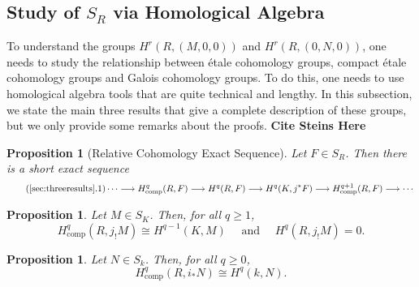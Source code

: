 \documentclass{article}
\newcommand{\comp}{\mathrm{comp}}
\theoremstyle{plain}
\newtheorem{proposition}[theorem]{Proposition}
\theoremstyle{definition}
\begin{document}
    \subsection{Study of \texorpdfstring{$S_R$}{TEXT} via Homological Algebra}\label{sec:threeresults}

    To understand the groups $H^r(R,(M,0,0))$ and $H^r(R,(0,N,0))$, one needs to study the relationship between \'{e}tale cohomology groups, compact \'{e}tale cohomology groups and Galois cohomology groups. To do this, one needs to use homological algebra tools that are quite technical and lengthy. In this subsection, we state the main three results that give a complete description of these groups, but we only provide some remarks about the proofs. \textbf{Cite Steins Here}

    \begin{proposition}[Relative Cohomology Exact Sequence]\label{prop:relcoh}
        Let $F\in S_R$. Then there is a short exact sequence
        \begin{equation}\label{eqn:relativeseq}\tag{\ref{sec:threeresults}.1}
            \cdots\longrightarrow H^q_{\comp}(R,F)\longrightarrow H^q(R,F)\longrightarrow H^q(K,j^*F)\longrightarrow H^{q+1}_{\comp}(R,F)\longrightarrow\cdots    
        \end{equation}
    \end{proposition}
    \begin{proposition}\label{prop:HqM}
        Let $M\in S_K$. Then, for all $q\geq 1$,
        $$H^q_{\comp}(R,j_!M)\cong H^{q-1}(K,M)\quad\text{ and }\quad H^q(R,j_!M)=0.$$        
    \end{proposition}
    \begin{proposition}\label{prop:HqN}
        Let $N\in S_k$. Then, for all $q\geq 0$,
        $$H^q_{\comp}(R,i_*N)\cong H^q(k,N).$$
    \end{proposition}
\end{document}
